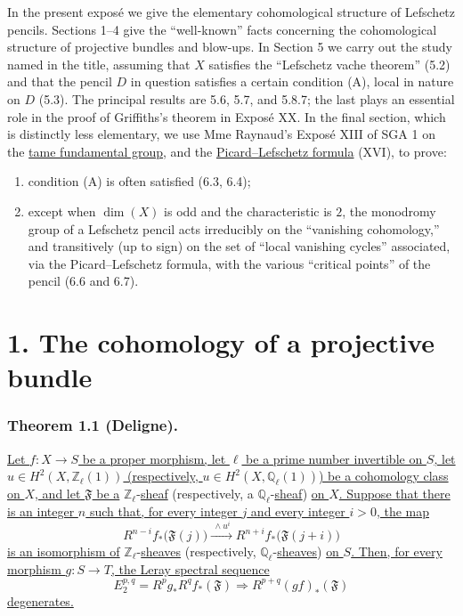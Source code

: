 In the present expos\'e we give the elementary cohomological structure of
Lefschetz pencils. Sections 1--4 give the ``well-known'' facts concerning the
cohomological structure of projective bundles and blow-ups. In Section 5 we
carry out the study named in the title, assuming that $X$ satisfies the
``Lefschetz vache theorem'' (5.2) and that the pencil $D$ in question satisfies
a certain condition (A), local in nature on $D$ (5.3). The principal results
are 5.6, 5.7, and 5.8.7; the last plays an essential role in the proof of
Griffiths's theorem in Expos\'e XX. In the final section, which is distinctly
less elementary, we use Mme Raynaud's Expos\'e XIII of SGA 1 on the
\underline{tame fundamental group}, and the \underline{Picard--Lefschetz
formula} (XVI), to prove:
\begin{enumerate}[label=(\arabic*)]
\item condition (A) is often satisfied (6.3, 6.4);
\item except when $\dim(X)$ is odd and the characteristic is $2$, the
monodromy group of a Lefschetz pencil acts irreducibly on the ``vanishing
cohomology,'' and transitively (up to sign) on the set of ``local vanishing
cycles'' associated, via the Picard--Lefschetz formula, with the various
``critical points'' of the pencil (6.6 and 6.7).
\end{enumerate}

\section*{1. The cohomology of a projective bundle}

\subsubsection*{Theorem 1.1 (Deligne).}
\underline{Let $f:X\longrightarrow S$ be a proper morphism, let $\ell$ be a
prime number invertible on $S$, let
$u\in H^2(X,\mathbb Z_\ell(1))$ (respectively,
$u\in H^2(X,\mathbb Q_\ell(1))$) be a cohomology class on $X$, and let
$\mathfrak F$ be a} $\mathbb Z_\ell$-\underline{sheaf} (respectively, a
$\mathbb Q_\ell$-\underline{sheaf}) \underline{on $X$. Suppose that there is an integer $n$ such
that, for every integer $j$ and every integer $i>0$, the map}
\begin{equation}\tag{1.1.1}
R^{n-i}f_*\bigl(\mathfrak F(j)\bigr)
\xrightarrow{\ \wedge u^i\ }
R^{n+i}f_*\bigl(\mathfrak F(j+i)\bigr)
\end{equation}
\underline{is an isomorphism of} $\mathbb Z_\ell$-\underline{sheaves} (respectively,
$\mathbb Q_\ell$-\underline{sheaves}) \underline{on $S$. Then, for every morphism
$g:S\longrightarrow T$, the Leray spectral sequence}
\[
E_2^{p,q}=R^pg_*R^qf_*(\mathfrak F)
\Longrightarrow R^{p+q}(gf)_*(\mathfrak F)
\]
\underline{degenerates.}

